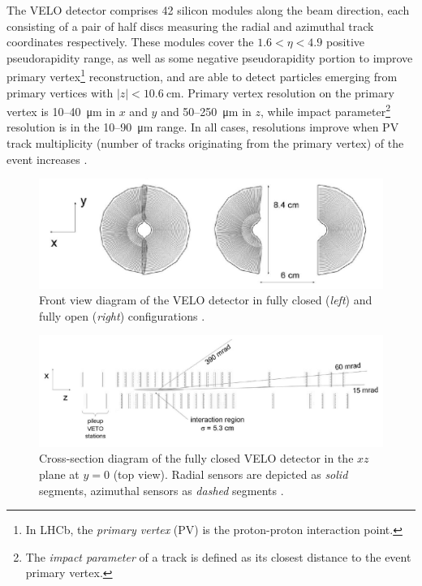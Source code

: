 The VELO detector comprises 42 silicon modules along the beam direction, each consisting of a pair of half discs measuring the radial and azimuthal track coordinates respectively. These modules cover the $1.6 < \eta < 4.9$ positive pseudorapidity range, as well as some negative pseudorapidity portion to improve primary vertex\footnote{In LHCb, the \textit{primary vertex} (PV) is the proton-proton interaction point.} reconstruction, and are able to detect particles emerging from primary vertices with $|z| < \SI{10.6}{\centi\meter}$.
Primary vertex resolution on the primary vertex is 10--40~\si{\micro\meter} in $x$ and $y$ and 50--250~\si{\micro\meter} in $z$, while impact parameter\footnote{The \textit{impact parameter} of a track is defined as its closest distance to the event primary vertex.} resolution is in the 10--90~\si{\micro\meter} range.
In all cases, resolutions improve when PV track multiplicity (number of tracks originating from the primary vertex) of the event increases \cite{VELOPerformance}.

\begin{figure}[t]
	\centering
	\includegraphics[width=\textwidth]{graphics/02-lhcb/VELO_xy.png}
	\caption[Front view diagram of the VELO detector.]{Front view diagram of the VELO detector in fully closed (\textit{left}) and fully open (\textit{right}) configurations \cite{Barbosa-Marinho:504321}.}
	\label{fig:2:VELO_xy}
\end{figure}

\begin{figure}[t]
	\centering
	\includegraphics[width=\textwidth]{graphics/02-lhcb/VELO_xz.png}
	\caption{Cross-section diagram of the fully closed VELO detector in the $xz$ plane at $y=0$ (top view). Radial sensors are depicted as \textit{solid} segments, azimuthal sensors as \textit{dashed} segments \cite{Barbosa-Marinho:504321}.}
	\label{fig:2:VELO_xz}
\end{figure}


